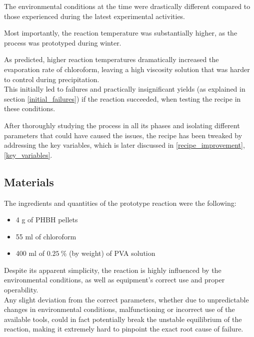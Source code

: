\documentclass{article}
\begin{document}
    The environmental conditions at the time were drastically different compared to those experienced during the latest experimental 
    activities. 

    Most importantly, the reaction temperature was substantially higher, as the process was prototyped during winter. 
    
    As predicted, higher reaction temperatures dramatically increased the evaporation rate of 
    chloroform, leaving a high viscosity solution that was harder to control during precipitation. \\

    This initially led to failures and practically insignificant yields (as explained in section \ref{initial_failures}) if 
    the reaction succeeded, when testing the recipe in these conditions.  

    After thoroughly studying the process in all its phases and isolating different parameters that could have caused the issues, 
    the recipe has been tweaked by addressing the key variables, which is later discussed 
    in \ref{recipe_improvement}, \ref{key_variables}. 

        \subsection{Materials\label{Components}}

        The ingredients and quantities of the prototype reaction were the following: 

            \begin{itemize}
                \item 4 g of PHBH pellets 
                \item 55 ml of chloroform 
                \item 400 ml of $0.25 \ \% $ (by weight) of PVA solution 
            \end{itemize} 
        

        Despite its apparent simplicity, the reaction is highly influenced by the environmental conditions, as well as
        equipment's correct use and proper operability. \\ 
        
        Any slight deviation from the correct parameters, whether due to 
        unpredictable changes in environmental conditions, malfunctioning or incorrect use of the available tools, could 
        in fact potentially break the unstable equilibrium of the reaction, making it extremely 
        hard to pinpoint the exact root cause of failure. \\  
\end{document}
